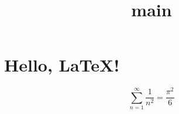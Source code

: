\documentclass{article}
\title{main}
\begin{document}
\section{Hello, \LaTeX!}
$$\sum_{n = 1}^\infty\frac1{n^2} = \frac{\pi^2}{6}$$
\end{document}
